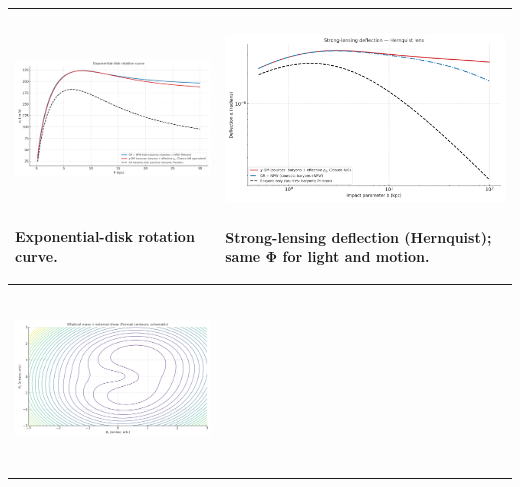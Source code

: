 \documentclass[
]{article}
\begin{document}
\begin{longtable}[]{@{}
  >{\raggedright\arraybackslash}p{}
  >{\raggedright\arraybackslash}p{}@{}}
\toprule\noalign{}
\begin{minipage}[b]{\linewidth}\raggedright
\includegraphics[width=3.16178in,height=1.89583in,alt={image}]{explainer_media/media/image1.png}

Exponential-disk rotation curve.
\end{minipage} & \begin{minipage}[b]{\linewidth}\raggedright
\includegraphics[width=3.17426in,height=1.90331in,alt={image}]{explainer_media/media/image2.png}

Strong-lensing deflection (Hernquist); same \(\mathbf{\Phi}\) for light
and motion.
\end{minipage} \\
\midrule\noalign{}
\endhead
\bottomrule\noalign{}
\endlastfoot
\includegraphics[width=3.17251in,height=1.90226in,alt={image}]{explainer_media/media/image3.png}


\end{longtable}
\end{document}
